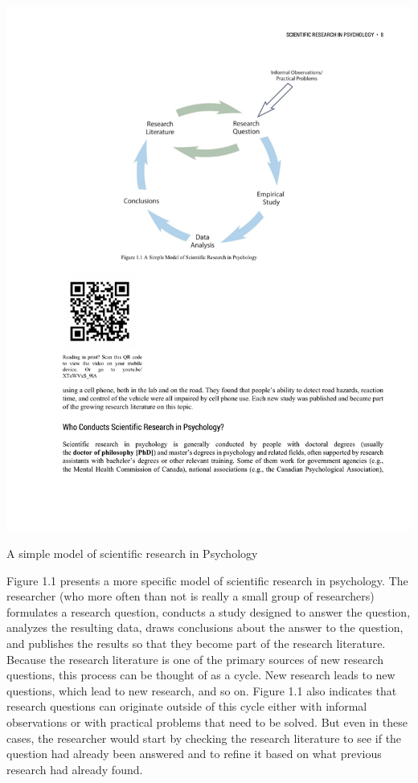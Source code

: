 \begin{marginfigure}[0in]
      \includegraphics[width=\linewidth]{figures/C1Figure1.pdf}
      \caption{A simple model of scientific research in Psychology}
      \label{fig:TThe research cycle}
\end{marginfigure}

Figure 1.1 presents a more specific model of scientific research in psychology. The researcher (who more often than not is really a small group of researchers) formulates a research question, conducts a study designed to answer the question, analyzes the resulting data, draws conclusions about the answer to the question, and publishes the results so that they become part of the research literature. Because the research literature is one of the primary sources of new research questions, this process can be thought of as a cycle. New research leads to new questions, which lead to new research, and so on. Figure 1.1 also indicates that research questions can originate outside of this cycle either with informal observations or with practical problems that need to be solved. But even in these cases, the researcher would start by checking the research literature to see if the question had already been answered and to refine it based on what previous research had already found.

